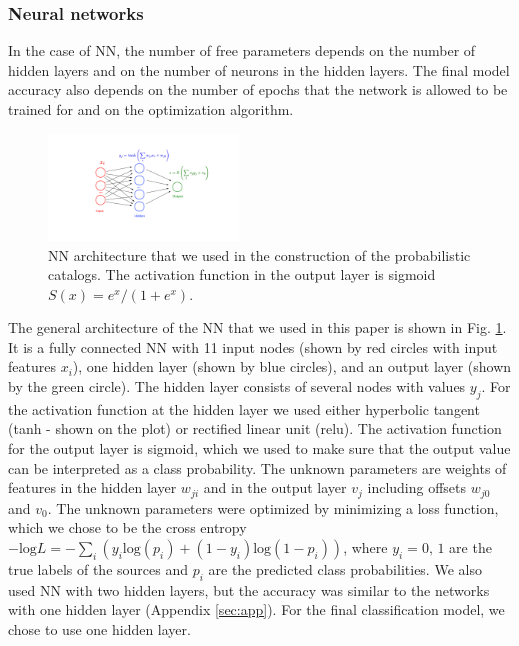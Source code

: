 \documentclass[referee]{aa} %
\begin{document}
\subsubsection{Neural networks}

In the case of NN, the number of free parameters depends on the number of hidden layers and on the number of neurons in the hidden layers. The final model accuracy also depends on the number of epochs that the network is allowed to be trained for and on the optimization algorithm. 

\begin{figure}[h]
\centering
\includegraphics[width=0.45\textwidth]{plots/CNN_network.pdf}
\caption{
NN architecture that we used in the construction of the probabilistic catalogs.
The activation function in the output layer is sigmoid $S(x) = {e^{x}}/{(1 + e^{x})}$.
}
\label{fig:NN_structure}
\end{figure}

The general architecture of the NN that we used in this paper is shown in Fig. \ref{fig:NN_structure}.
It is a fully connected NN with 11 input nodes (shown by red circles with input features $x_i$), one hidden layer (shown by blue circles),
and an output layer (shown by the green circle).
The hidden layer consists of several nodes with values $y_j$. 
For the activation function at the hidden layer we used either hyperbolic tangent (tanh - shown on the plot) or rectified linear unit (relu).
The activation function for the output layer is sigmoid, which we used to make sure that the output value can be interpreted as a class probability.
The unknown parameters are weights of features in the hidden layer $w_{ji}$ and in the output layer $v_j$ including
offsets $w_{j0}$ and $v_0$.
The unknown parameters were optimized by minimizing a loss function, which we chose to be
the cross entropy
$-\text{log}L = - \sum_i (y_i\text{log}(p_i)+(1-y_i)\text{log}(1 - p_i))$, 
where $y_i = 0,\,1$ are the true labels of the sources and $p_i$ are the predicted class probabilities.
We also used NN with two hidden layers, but the accuracy was similar to the networks with one hidden layer (Appendix \ref{sec:app}). For the final classification model, we chose to use one hidden layer.
\end{document}
